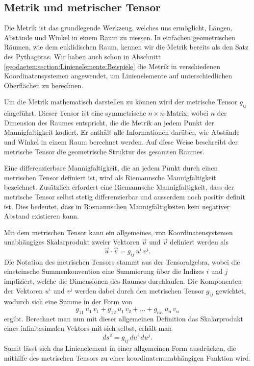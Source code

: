 \subsection{Metrik und metrischer Tensor}
Die Metrik ist das grundlegende Werkzeug, welches uns ermöglicht, Längen, Abstände und Winkel in einem Raum zu messen.
In einfachen geometrischen Räumen, wie dem euklidischen Raum, kennen wir die Metrik bereits als den Satz des Pythagoras.
Wir haben auch schon in Abschnitt \ref{geodaeten:section:Linienelemente:Beispiele} die Metrik in verschiedenen Koordinatensystemen angewendet, um Linienelemente auf unterschiedlichen Oberflächen zu berechnen.

Um die Metrik mathematisch darstellen zu können wird der metrische Tensor $g_{ij}$ eingeführt.
Dieser Tensor ist eine symmetrische $n \times n$-Matrix, wobei $n$ der Dimension des Raumes entspricht, die die Metrik an jedem Punkt der Mannigfaltigkeit kodiert.
Er enthält alle Informationen darüber, wie Abstände und Winkel in einem Raum berechnet werden.
Auf diese Weise beschreibt der metrische Tensor die geometrische Struktur des gesamten Raumes.

Eine differenzierbare Mannigfaltigkeit, die an jedem Punkt durch einen metrischen Tensor definiert ist, wird als Riemannsche Mannigfaltigkeit bezeichnet. Zusätzlich erfordert eine Riemannsche Mannigfaltigkeit, dass der metrische Tensor selbst stetig differenzierbar und ausserdem noch positiv definit ist. 
Dies bedeutet, dass in Riemannschen Mannigfaltigkeiten kein negativer Abstand existieren kann.

Mit dem metrischen Tensor kann ein allgemeines, von Koordinatensystemen unabhängiges Skalarprodukt zweier Vektoren $\vec{u}$ und $\vec{v}$ definiert werden als
\begin{equation}
	\vec{u} \cdot \vec{v} = g_{ij} \, u^i \, v^j.
\end{equation}
Die Notation des metrischen Tensors stammt aus der Tensoralgebra,
wobei die einsteinsche Summenkonvention eine Summierung über die Indizes $i$ und $j$ impliziert, welche die Dimensionen des Raumes durchlaufen.
Die Komponenten der Vektoren $u^i$ und $v^j$ werden dabei durch den metrischen Tensor $g_{ij}$ gewichtet, wodurch sich eine Summe in der Form von
\begin{equation}
	g_{11} \, u_1 \, v_1 + g_{12} \, u_1 \, v_2 + \dots + g_{nn} \, u_n \, v_n
\end{equation}
ergibt.
Berechnet man nun mit dieser allgemeinen Definition das Skalarprodukt eines infinitesimalen Vektors mit sich selbst, erhält man
\begin{equation}
	ds^2 = g_{ij} \, du^i \, du^j.
	\label{geodaeten:equation:MetrischerTensor:AllgemeinesLinienelement}
\end{equation}
Somit lässt sich das Linienelement in einer allgemeinen Form ausdrücken, die mithilfe des metrischen Tensors zu einer koordinatenunabhängigen Funktion wird.

